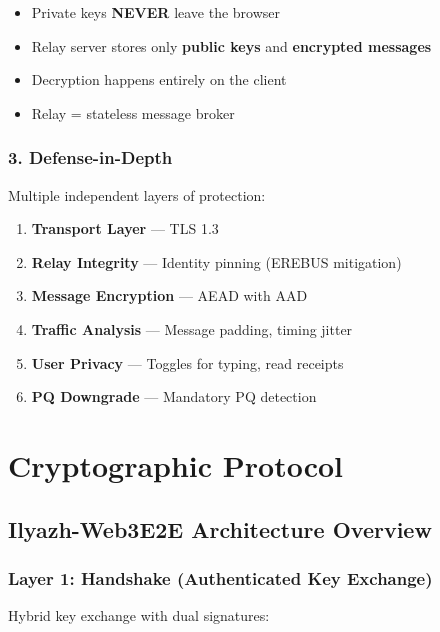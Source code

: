 \documentclass[11pt,a4paper,oneside]{book}
\begin{document}
\begin{itemize}
  \item Private keys \textbf{NEVER} leave the browser
  \item Relay server stores only \textbf{public keys} and \textbf{encrypted messages}
  \item Decryption happens entirely on the client
  \item Relay = stateless message broker
\end{itemize}
\vspace{-0.2cm}\subsection{3. Defense-in-Depth}
Multiple independent layers of protection:
\begin{enumerate}
  \item \textbf{Transport Layer} — TLS 1.3
  \item \textbf{Relay Integrity} — Identity pinning (EREBUS mitigation)
  \item \textbf{Message Encryption} — AEAD with AAD
  \item \textbf{Traffic Analysis} — Message padding, timing jitter
  \item \textbf{User Privacy} — Toggles for typing, read receipts
  \item \textbf{PQ Downgrade} — Mandatory PQ detection
\end{enumerate}
\vspace{-0.5cm}\chapter{Cryptographic Protocol}
\vspace{-0.3cm}\section{Ilyazh-Web3E2E Architecture Overview}
\vspace{-0.2cm}\subsection{Layer 1: Handshake (Authenticated Key Exchange)}
Hybrid key exchange with dual signatures:
\end{document}
